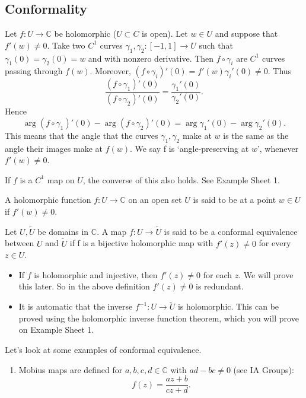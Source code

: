 \documentclass[a4paper]{scrartcl}
\begin{document}
\subsection{Conformality}
Let $f: U \rightarrow \mathbb{C}$ be holomorphic ($U \subset C $ is open). Let $w \in U$ and suppose that $f' (w) \neq 0$. Take two $C^{1}$ curves $\gamma_1 , \gamma_2 : [-1,1] \rightarrow U$ such that $\gamma_1 (0)=\gamma_2 (0)=w$ and with nonzero derivative. Then $f \circ \gamma_i$ are $C^{1}$ curves passing through $f (w)$. Moreover, $(f \circ \gamma_i)' (0)=f' (w)\gamma_{i}' (0)\neq 0$. Thus \[
\frac{(f \circ \gamma_1 )' (0)}{(f \circ \gamma_2 )' (0)}= \frac{\gamma_1 ' (0)}{\gamma_2 ' (0)}
.\]
Hence \[
\operatorname{arg}(f \circ \gamma_1 )' (0)-\operatorname{arg}(f \circ \gamma_2 )' (0)=\operatorname{arg}\gamma_1 ' (0)-\operatorname{arg}\gamma_2 ' (0)
.\] This means that the angle that the curves $\gamma_1 , \gamma_2 $ make at $w$ is the same as the angle their images make at $f (w)$. We say f is `angle-preserving at $w$', whenever $f' (w) \neq 0$.
\begin{remark}
      If $f$ is a $C^{1}$ map on $U$, the converse of this also holds. See Example Sheet 1. 
\end{remark}
\begin{definition}
      A holomorphic function $f: U \rightarrow \mathbb{C}$ on an open set $U$ is said to be  at a point $w \in U$ if $f' (w) \neq 0$.
\end{definition}
\begin{definition}
      Let $U, \widetilde{U} $ be domains in $\mathbb{C}$. A map $f: U \rightarrow \widetilde{U}$ is said to be a conformal equivalence between $U$ and $\widetilde{U}$ if f is a bijective holomorphic map with $f' (z) \neq 0$ for every $z \in U$.
\end{definition}
\begin{remark}
      \begin{itemize}
           \item If $f$ is holomorphic and injective, then $f' (z) \neq 0$ for each $z$. We will prove this later. So in the above definition $f' (z) \neq 0$ is redundant. 
           \item It is automatic that the inverse ${f}^{-1}: U \rightarrow \widetilde{U}$ is holomorphic. This can be proved using the holomorphic inverse function theorem, which you will prove on Example Sheet 1.
      \end{itemize}
\end{remark}
\begin{example}
     Let's look at some examples of conformal equivalence.
      \begin{enumerate}
           \item Mobius maps are defined for $a,b,c,d \in \mathbb{C}$ with $ad-bc \neq 0$ (see IA Groups): \[
           f (z)= \frac{az+b}{cz+d}
           .\] 
      \end{enumerate}
\end{example}
\end{document}
